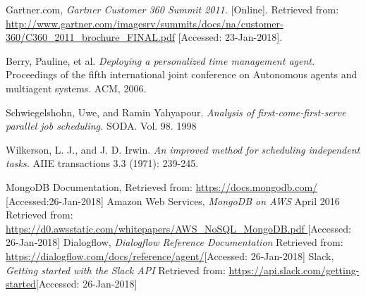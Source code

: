 \documentclass{sig-alternate-05-2015}
\begin{document}
 
\begin{thebibliography}{999}

  Gartner.com,
  \emph{ Gartner Customer 360 Summit 2011.} [Online].
  Retrieved from: \url{http://www.gartner.com/imagesrv/summits/docs/na/customer-360/C360_2011_brochure_FINAL.pdf} [Accessed: 23-Jan-2018].
  
  Berry, Pauline, et al.
  \emph{ Deploying a personalized time management agent.}
  Proceedings of the fifth international joint conference on Autonomous agents and multiagent systems. ACM, 2006.

  Schwiegelshohn, Uwe, and Ramin Yahyapour.
  \emph{Analysis of first-come-first-serve parallel job scheduling.}
SODA. Vol. 98. 1998
  
Wilkerson, L. J., and J. D. Irwin.
  \emph{An improved method for scheduling independent tasks.}
  AIIE transactions 3.3 (1971): 239-245.

MongoDB Documentation,
Retrieved from: \url{https://docs.mongodb.com/}
[Accessed:26-Jan-2018]
  Amazon Web Services,
  \emph{MongoDB on AWS} April 2016
  Retrieved from: \url{https://d0.awsstatic.com/whitepapers/AWS_NoSQL_MongoDB.pdf
} [Accessed: 26-Jan-2018]
   Dialogflow,
  \emph{Dialogflow Reference Documentation}
  Retrieved from: \url{https://dialogflow.com/docs/reference/agent/}[Accessed: 26-Jan-2018]
   Slack,
  \emph{Getting started with the Slack API}
  Retrieved from: \url{https://api.slack.com/getting-started}[Accessed: 26-Jan-2018]


\end{thebibliography}
\end{document}
